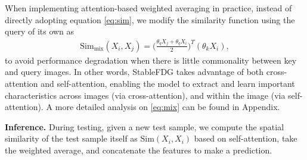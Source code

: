 \documentclass{article}
\theoremstyle{plain}
\theoremstyle{definition}
\theoremstyle{remark}
\begin{document}
 
When implementing attention-based weighted averaging in practice,  instead of directly adopting equation  \eqref{eq:sim}, we modify the similarity function using the query of its own  as
\begin{align}\label{eq:mix}
\mathrm{Sim_{mix}}(X_i, X_j) =  \bigg( \frac{\theta_q X_j + \theta_q X_i }{2} \bigg)^T (\theta_k X_i),
\end{align} 
to avoid performance degradation  when there is little commonality between key and query images. In other words, StableFDG takes advantage of both cross-attention and self-attention, enabling the model to extract and learn important characteristics across images (via cross-attention), and within the image (via self-attention).  A more detailed analysis on  \eqref{eq:mix} can be found in Appendix. %
 
\textbf{Inference.} During testing, given a new test sample, we compute the spatial similarity of the test sample itself as  $\mathrm{Sim}(X_i, X_i)$ based on  self-attention,   take the weighted average, and concatenate the features to make a prediction.   %

\end{document}
